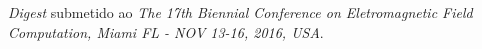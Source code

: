 \label{ap:D}

\textit{Digest} submetido ao \textit{The 17th Biennial Conference on Eletromagnetic Field Computation, Miami FL - NOV 13-16, 2016, USA}.

% 